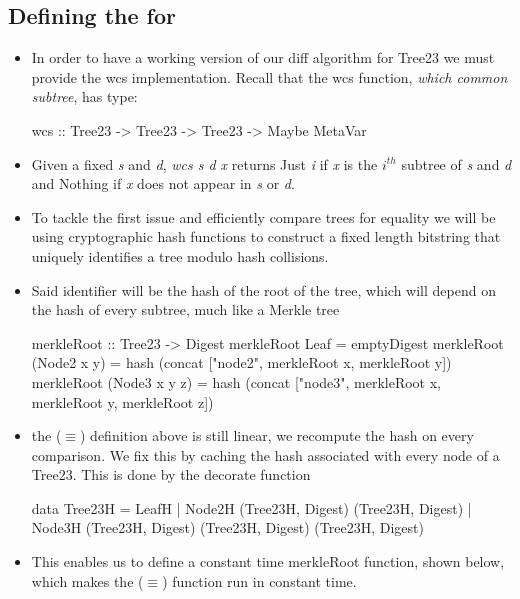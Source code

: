 \subsection{Defining the  for }

\begin{itemize}
    \item In order to have a working version of our diff algorithm for Tree23 we must provide the wcs implementation. Recall that the wcs function, \textit{which common subtree}, has type:
    \begin{haskell}
        wcs :: Tree23 -> Tree23 -> Tree23 -> Maybe MetaVar
    \end{haskell}
    \item Given a fixed \textit{s} and \textit{d}, \textit{wcs s d x} returns Just \textit{i} if \textit{x} is the $i^{th}$ subtree of
    \textit{s} and \textit{d} and Nothing if \textit{x} does not appear in \textit{s} or \textit{d}.
    \item To tackle the first issue and efficiently compare trees for equality we will be using cryptographic hash functions to construct a fixed length bitstring that uniquely identifies a tree modulo hash collisions.
    \item Said identifier will be the hash of the root of the tree, which will depend on the hash of every subtree, much like a Merkle tree
    \begin{haskell}
        merkleRoot :: Tree23 -> Digest
        merkleRoot Leaf = emptyDigest
        merkleRoot (Node2 x y)
            = hash (concat ["node2", merkleRoot x, merkleRoot y])
        merkleRoot (Node3 x y z)
            = hash (concat ["node3", merkleRoot x, merkleRoot y, merkleRoot z])
    \end{haskell}
    \item the ($\equiv$) definition above is still
    linear, we recompute the hash on every comparison. We fix this by caching the hash associated with every node of a Tree23. This is done by the decorate function
    \begin{haskell}
        data Tree23H = LeafH
                     | Node2H (Tree23H, Digest) (Tree23H, Digest)
                     | Node3H (Tree23H, Digest) 
                              (Tree23H, Digest) 
                              (Tree23H, Digest)
    \end{haskell}
    \item This enables us to define a constant time merkleRoot function, shown below, which makes the ($\equiv$) function run in constant time.

\end{itemize}

